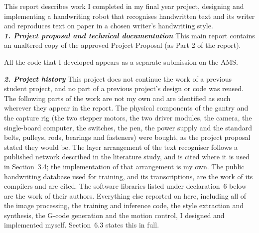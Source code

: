 
This report describes work I completed in my final year project, designing and implementing a handwriting robot that recognises handwritten text and its writer and reproduces text on paper in a chosen writer's handwriting style.
\\[2ex]
\textbf{\textit{1. Project proposal and technical documentation}} \newline
This main report contains an unaltered copy of the approved Project Proposal (as Part 2 of the report).

All the code that I developed appears as a separate submission on the AMS.

\textbf{\textit{2. Project history}} \newline
This project does not continue the work of a previous student project, and no part of a previous
project's design or code was reused. The following parts of the work are not my own and are
identified as such wherever they appear in the report. The physical components of the gantry and the
capture rig (the two stepper motors, the two driver modules, the camera, the single-board computer,
the switches, the pen, the power supply and the standard belts, pulleys, rods, bearings and
fasteners) were bought, as the project proposal stated they would be. The layer arrangement of the
text recogniser follows a published network described in the literature study, and is cited where it
is used in Section~3.4; the implementation of that arrangement is my own. The public handwriting
database used for training, and its transcriptions, are the work of its compilers and are cited. The
software libraries listed under declaration~6 below are the work of their authors. Everything else
reported on here, including all of the image processing, the training and inference code, the style
extraction and synthesis, the G-code generation and the motion control, I designed and implemented
myself. Section~6.3 states this in full.

